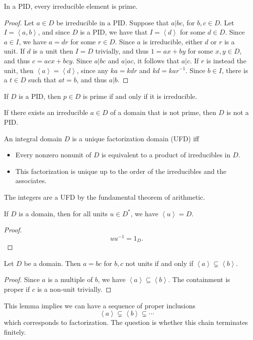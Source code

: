 \begin{theorem}\label{thm:3.1}
	In a PID, every irreducible element is prime.
\end{theorem}
\begin{proof}
	Let $a\in D$ be irreducible in a PID. Suppose that $a|bc$, for $b,c\in D$. Let $I=\left\langle a,b \right\rangle $, and since $D$ is a PID, we have that $I=\left\langle d \right\rangle $ for some $d\in D$. Since $a\in I$, we have $a=dr$ for some $r\in D$. Since $a$ is irreducible, either $d$ or $r$ is a unit. If $d$ is a unit then $I=D$ trivially, and thus $1=ax+by$ for some $x,y\in D$, and thus $c=acx+bcy$. Since $a|bc$ and $a|ac$, it follows that $a|c$. If $r$ is instead the unit, then $\left\langle a \right\rangle =\left\langle d \right\rangle $, since any $ka=kdr$ and $kd=kar^{-1} $. Since $b\in I$, there is a $t\in D$ such that $at=b$, and thus $a|b$.
\end{proof}
\begin{corollary}\label{cor:3.1}
	If $D$ is a PID, then $p\in D$ is prime if and only if it is irreducible.
\end{corollary}
\begin{corollary}\label{cor:3.2}
	If there exists an irreducible $a\in D$ of a domain that is not prime, then $D$ is not a PID.
\end{corollary}
\begin{definition}\label{dfn:3.3}
	An integral domain $D$ is a unique factorization domain (UFD) iff
	\begin{itemize}
		\item Every nonzero nonunit of $D$ is equivalent to a product of irreducibles in $D$.
		\item This factorization is unique up to the order of the irreducibles and the associates.
	\end{itemize}
\end{definition}

The integers are a UFD by the fundamental theorem of arithmetic.

\begin{lemma}\label{lma:3.1}
	If $D$ is a domain, then for all units $u\in D^*$, we have $\left\langle u \right\rangle =D$.
\end{lemma}
\begin{proof}
	\[
		uu^{-1} =1_D
	.\]
\end{proof}
\begin{lemma}\label{lma:3.2}
	Let $D$ be a domain. Then $a=bc$ for $b,c$ not units if and only if $\left\langle a \right\rangle \subsetneq \left\langle b \right\rangle $.
\end{lemma}
\begin{proof}
	Since $a$ is a multiple of $b$, we have $\left\langle a \right\rangle \subseteq \left\langle b \right\rangle $. The containment is proper if $c$ is a non-unit trivially.
\end{proof}

This lemma implies we can have a sequence of proper inclusions
\[
	\left\langle a \right\rangle \subsetneq \left\langle b \right\rangle \subsetneq \cdots 
\]
which corresponds to factorization. The question is whether this chain terminates finitely.
